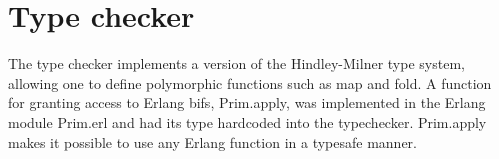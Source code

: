\section{Type checker}

The type checker implements a version of the Hindley-Milner type system, allowing one to define polymorphic functions such as
map and fold. A function for granting access to Erlang bifs, Prim.apply, was implemented in the Erlang module Prim.erl and had its type hardcoded into the typechecker. Prim.apply makes it possible to use any Erlang function in a typesafe manner.


